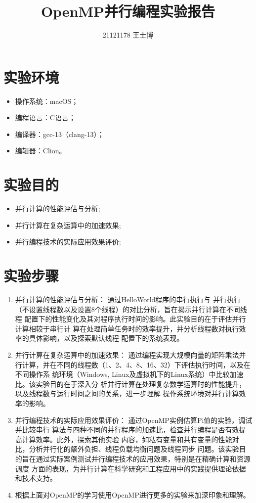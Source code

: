 \documentclass{article}
\title{\Huge OpenMP并行编程实验报告}
\author{21121178 王士博}
\begin{document}
\maketitle
\section{实验环境}
\begin{itemize}
    \item 操作系统：macOS；
    \item 编程语言：C语言；
    \item 编译器：gcc-13（clang-13）；
    \item 编辑器：Clion。
\end{itemize}
\section{实验目的}
\begin{itemize}
    \item 并行计算的性能评估与分析;
    \item 并行计算在复杂运算中的加速效果;
    \item 并行编程技术的实际应用效果评价;
\end{itemize}
\section{实验步骤}
\begin{enumerate}
    \item 并行计算的性能评估与分析： 通过HelloWorld程序的串行执行与
    并行执行（不设置线程数以及设置8个线程）的对比分析，旨在揭示并行计算在不同线程
    配置下的性能变化及其对程序执行时间的影响。此实验目的在于评估并行计算相较于串行计
    算在处理简单任务时的效率提升，并分析线程数对执行效率的具体影响，以及探索默认线程
    配置下的系统表现。
    \item 并行计算在复杂运算中的加速效果： 通过编程实现大规模向量的矩阵乘法并
    行计算，并在不同的线程数（1、2、4、8、16、32）下评估执行时间，以及在不同操作系
    统环境（Windows, Linux及虚拟机下的Linux系统）中比较加速比。该实验目的在于深入分
    析并行计算在处理复杂数学运算时的性能提升，以及线程数与运行时间之间的关系，进一步理解
    操作系统环境对并行计算效率的影响。
    \item 并行编程技术的实际应用效果评价： 通过OpenMP实例估算Pi值的实验，调试并比较串行
    算法与四种不同的并行程序的加速比，检查并行编程是否有效提高计算效率。此外，探索其他实验
    内容，如私有变量和共有变量的性能对比，分析并行化的额外负担、线程负载均衡问题及线程同步
    问题。该实验目的旨在通过实际案例测试并行编程技术的应用效果，特别是在精确计算和资源调度
    方面的表现，为并行计算在科学研究和工程应用中的实践提供理论依据和技术支持。
    \item 根据上面对OpenMP的学习使用OpenMP进行更多的实验来加深印象和理解。
\end{enumerate}
\end{document}
